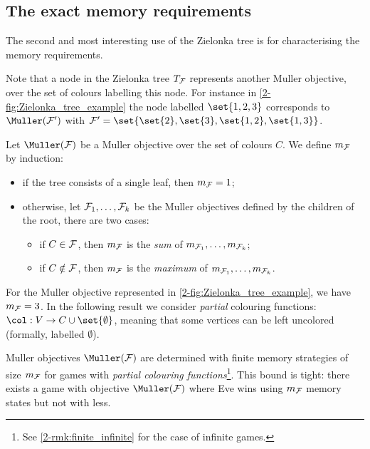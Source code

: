 \subsection*{The exact memory requirements}
The second and most interesting use of the Zielonka tree is for characterising the memory requirements.

Note that a node in the Zielonka tree $T_{\mathcal{F}}$ represents another Muller objective, over the set of colours labelling this node.
For instance in \cref{2-fig:Zielonka_tree_example} the node labelled $\set{1,2,3}$ corresponds to $\Muller(\F')$ with
$\F' = \set{\set{2}, \set{3}, \set{1,2}, \set{1,3}}$.

\begin{definition}
Let $\Muller(\F)$ be a Muller objective over the set of colours $C$.
We define $m_{\mathcal{F}}$ by induction:
\begin{itemize}
	\item if the tree consists of a single leaf, then $m_{\mathcal{F}} = 1$;
	\item otherwise, let $\mathcal{F}_1,\dots,\mathcal{F}_k$ be the Muller objectives defined by the children of the root,
	there are two cases:
	\begin{itemize}
		\item if $C \in \mathcal{F}$, then $m_{\mathcal{F}}$ is the \textit{sum} of $m_{\mathcal{F}_1},\dots,m_{\mathcal{F}_k}$;
		\item if $C \notin \mathcal{F}$, then $m_{\mathcal{F}}$ is the \textit{maximum} of $m_{\mathcal{F}_1},\dots,m_{\mathcal{F}_k}$.
	\end{itemize}
\end{itemize}
\end{definition}

For the Muller objective represented in \cref{2-fig:Zielonka_tree_example}, we have $m_{\mathcal{F}} = 3$.
In the following result we consider \textit{partial} colouring functions: $\col : V \to C \cup \set{\emptyset}$,
meaning that some vertices can be left uncolored (formally, labelled $\emptyset$).

\begin{theorem}
\label{2-thm:characterisation_Zielonka_tree}
Muller objectives $\Muller(\F)$ are determined with finite memory strategies of size $m_{\mathcal{F}}$
for games with \textit{partial colouring functions}\footnote{See \cref{2-rmk:finite_infinite} for the case of infinite games.}.
This bound is tight: there exists a game with objective $\Muller(\F)$ where Eve wins using $m_{\mathcal{F}}$ memory states
but not with less.
\end{theorem}

